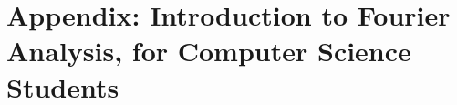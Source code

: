 \documentclass{article}
\newcommand{\LoadSection}[1]{{}}
\newcommand{\LoadAppendix}[1]{{}}
\begin{document}
    \LoadSection{standard-implementations/javascript/intro}
    \newpage
    \LoadSection{standard-implementations/javascript/max-heap-implementation}
    \newpage
    \LoadSection{standard-implementations/python}

\newpage
{}

\section{Appendix: Introduction to Fourier Analysis, for Computer Science Students}
\label{sec:appendix--fourier}

    \LoadAppendix{intro-to-fourier-analysis/background}

%
\end{document}

